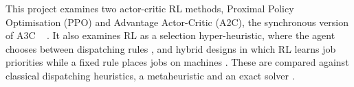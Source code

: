 \documentclass[12pt]{article}
\providecommand{\DIFaddtex}[1]{{\color{red}#1}} %
\providecommand{\DIFdeltex}[1]{} %
\providecommand{\DIFaddbegin}{} %
\providecommand{\DIFaddend}{} %
\providecommand{\DIFdelbegin}{} %
\providecommand{\DIFdelend}{} %
\providecommand{\DIFadd}[1]{\texorpdfstring{\DIFaddtex{#1}}{#1}} %
\providecommand{\DIFdel}[1]{\texorpdfstring{\DIFdeltex{#1}}{}} %
\providecommand{\DIFscaledelfig}{0.5}
\newlength{\DIFdelgraphicswidth} %
\newlength{\DIFdelgraphicsheight} %
\providecommand{\DIFaddincludegraphics}[2][]{{\color{blue}\fbox{\DIFOincludegraphics[#1]{#2}}}} %
\providecommand{\DIFdelincludegraphics}[2][]{%
\sbox{\DIFdelgraphicsbox}{\DIFOincludegraphics[#1]{#2}}%
\settoboxwidth{\DIFdelgraphicswidth}{\DIFdelgraphicsbox} %
\settoboxtotalheight{\DIFdelgraphicsheight}{\DIFdelgraphicsbox} %
\scalebox{\DIFscaledelfig}{%
\parbox[b]{\DIFdelgraphicswidth}{\usebox{\DIFdelgraphicsbox}\\[-\baselineskip] \rule{\DIFdelgraphicswidth}{0em}}\llap{\resizebox{\DIFdelgraphicswidth}{\DIFdelgraphicsheight}{%
\setlength{\unitlength}{\DIFdelgraphicswidth}%
\begin{picture}(1,1)%
\thicklines\linethickness{2pt} %
{\color[rgb]{1,0,0}\put(0,0){\framebox(1,1){}}}%
{\color[rgb]{1,0,0}\put(0,0){\line( 1,1){1}}}%
{\color[rgb]{1,0,0}\put(0,1){\line(1,-1){1}}}%
\end{picture}%
}\hspace*{3pt}}} %
} %
\DeclareRobustCommand{\DIFaddbegin}{\DIFOaddbegin \let\includegraphics\DIFaddincludegraphics} %
\DeclareRobustCommand{\DIFaddend}{\DIFOaddend \let\includegraphics\DIFOincludegraphics} %
\DeclareRobustCommand{\DIFdelbegin}{\DIFOdelbegin \let\includegraphics\DIFdelincludegraphics} %
\DeclareRobustCommand{\DIFdelend}{\DIFOaddend \let\includegraphics\DIFOincludegraphics} %
\begin{document}
\DIFdelbegin %

\DIFdelend 

This project examines two actor-critic RL methods\DIFdelbegin \DIFdel{; }\DIFdelend \DIFaddbegin \DIFadd{, }\DIFaddend Proximal Policy Optimisation (PPO) and Advantage Actor-Critic (A2C), the synchronous version of A3C \DIFdelbegin \DIFdel{\mbox{%
\cite{schulman2017ppo, mnih2016a3c, apxml_a2c_a3c_2026, aigreeksActorCritic, chadia2023understandingRL, konda1999actorcritic}}\hskip0pt%
. We also examine variations like hyper-heuristics }\DIFdelend \DIFaddbegin \DIFadd{\mbox{%
\cite{schulman2017ppo, mnih2016a3c, konda1999actorcritic, chadia2023understandingRL}}\hskip0pt%
. It also examines RL as a selection hyper-heuristic, where the agent chooses between dispatching rules }\DIFaddend \cite{burke2013hyperheuristicsurvey, lassoued2026hyperheuristic, cie2025dispatchruleselection}, and hybrid \DIFdelbegin \DIFdel{RL }\DIFdelend \DIFaddbegin \DIFadd{designs in which RL learns job priorities while a fixed rule places jobs on machines }\DIFaddend \cite{min2022atctuning, chen2024drlgphh}. These \DIFdelbegin \DIFdel{learning algorithms are then placed }\DIFdelend \DIFaddbegin \DIFadd{are compared }\DIFaddend against classical dispatching heuristics\DIFaddbegin \DIFadd{, a metaheuristic and an exact solver }\DIFaddend \cite{vepsalainen1987atc, ortools}.
\end{document}
